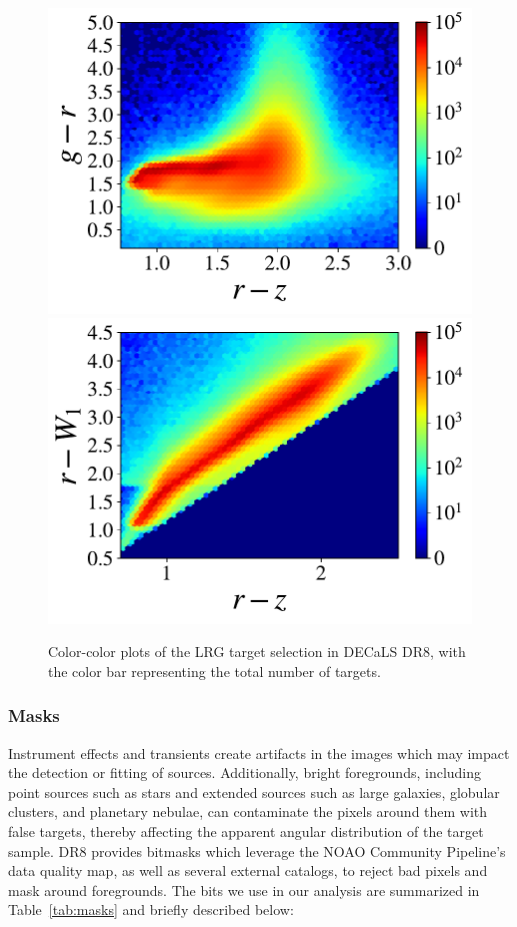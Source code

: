 \documentclass[a4paper,usenatbib]{mnras}
\begin{document}
\begin{figure}
\centering
\includegraphics[width=0.7\columnwidth, trim={0.35cm 0 0 0},clip]{figures/LRG_colorcolor_grz.pdf}
\includegraphics[width=0.7\columnwidth, trim={0.35cm 0 0 0},clip]{figures/LRG_colorcolor_rzW1.pdf}
\caption{Color-color plots of the LRG target selection in DECaLS DR8, with the color bar representing the total number of targets.}
\label{fig:colorcolor}
\end{figure}


\subsubsection{Masks}
\label{sec:data:masks}

Instrument effects and transients create artifacts in the images which may impact the detection or fitting of sources. Additionally, bright foregrounds, including point sources such as stars and extended sources such as large galaxies, globular clusters, and planetary nebulae, can contaminate the pixels around them with false targets, thereby affecting the apparent angular distribution of the target sample. DR8 provides bitmasks which leverage the NOAO Community Pipeline's data quality map, as well as several external catalogs, to reject bad pixels and mask around foregrounds. The bits we use in our analysis are summarized in Table~\ref{tab:masks} and briefly described below:
\end{document}
